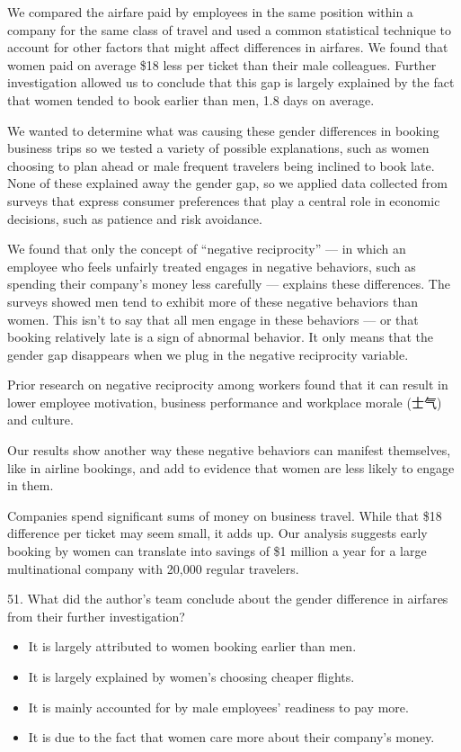 \documentclass[UTF8,11pt]{ctexart}
\begin{document}
We compared the airfare paid by employees in the same position within a company for the same class of travel and used a common statistical technique to account for other factors that might affect differences in airfares. We found that women paid on average \$18 less per ticket than their male colleagues. Further investigation allowed us to conclude that this gap is largely explained by the fact that women tended to book earlier than men, 1.8 days on average.


We wanted to determine what was causing these gender differences in booking business trips so we tested a variety of possible explanations, such as women choosing to plan ahead or male frequent travelers being inclined to book late. None of these explained away the gender gap, so we applied data collected from surveys that express consumer preferences that play a central role in economic decisions, such as patience and risk avoidance.


We found that only the concept of “negative reciprocity” — in which an employee who feels unfairly treated engages in negative behaviors, such as spending their company’s money less carefully — explains these differences. The surveys showed men tend to exhibit more of these negative behaviors than women. This isn’t to say that all men engage in these behaviors — or that booking relatively late is a sign of abnormal behavior. It only means that the gender gap disappears when we plug in the negative reciprocity variable.


Prior research on negative reciprocity among workers found that it can result in lower employee motivation, business performance and workplace morale (士气) and culture.


Our results show another way these negative behaviors can manifest themselves, like in airline bookings, and add to evidence that women are less likely to engage in them.


Companies spend significant sums of money on business travel. While that \$18 difference per ticket may seem small, it adds up. Our analysis suggests early booking by women can translate into savings of \$1 million a year for a large multinational company with 20,000 regular travelers.


51. What did the author’s team conclude about the gender difference in airfares from their further investigation?


\begin{itemize}[leftmargin=2em,itemsep=.2em,topsep=.4em]\item[A.] It is largely attributed to women booking earlier than men.
\item[B.] It is largely explained by women’s choosing cheaper flights.
\item[C.] It is mainly accounted for by male employees’ readiness to pay more.
\item[D.] It is due to the fact that women care more about their company’s money.
\end{itemize}
\end{document}
